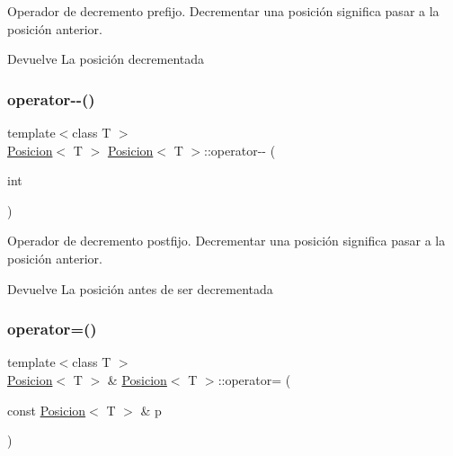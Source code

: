 Operador de decremento prefijo. Decrementar una posición significa pasar a la posición anterior. 

\begin{DoxyReturn}{Devuelve}
La posición decrementada 
\end{DoxyReturn}
\mbox{\label{classPosicion_a31bc501aa4cfb1dd0fdf47a711aada09}} 
\subsubsection{\texorpdfstring{operator-\/-\/()}{operator--()}\hspace{0.1cm}{\footnotesize\ttfamily [2/2]}}
{\footnotesize\ttfamily template$<$class T $>$ \\
\mbox{\hyperlink{classPosicion}{Posicion}}$<$ T $>$ \mbox{\hyperlink{classPosicion}{Posicion}}$<$ T $>$\+::operator-\/-\/ (\begin{DoxyParamCaption}\item[{int}]{ }\end{DoxyParamCaption})}



Operador de decremento postfijo. Decrementar una posición significa pasar a la posición anterior. 

\begin{DoxyReturn}{Devuelve}
La posición antes de ser decrementada 
\end{DoxyReturn}
\mbox{\label{classPosicion_a0c65060f8b49a04c46b78f7256289294}} 
\subsubsection{\texorpdfstring{operator=()}{operator=()}}
{\footnotesize\ttfamily template$<$class T $>$ \\
\mbox{\hyperlink{classPosicion}{Posicion}}$<$ T $>$ \& \mbox{\hyperlink{classPosicion}{Posicion}}$<$ T $>$\+::operator= (\begin{DoxyParamCaption}\item[{const \mbox{\hyperlink{classPosicion}{Posicion}}$<$ T $>$ \&}]{p }\end{DoxyParamCaption})}



